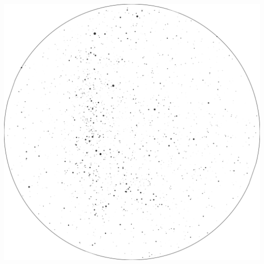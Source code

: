 \documentclass{./SAS-class-skygen}
\begin{document}
	\vspace{0.5cm}
    \begin{center}
    \includegraphics[width=\textwidth]{./pics/skychart34.png}
    \end{center}
    
    
\end{document}
